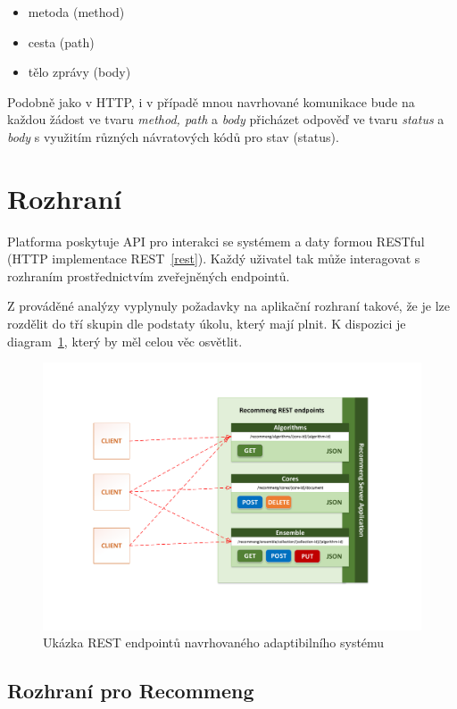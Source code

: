 \documentclass[thesis=M,czech]{FITthesis}[2014/05/07]
\begin{document}
\begin{itemize}
	\item metoda (method)
	\item cesta (path)
	\item tělo zprávy (body)
\end{itemize}

Podobně jako v HTTP, i v případě mnou navrhované komunikace bude na každou žádost ve tvaru \emph{method, path} a \emph{body} přicházet odpověď ve tvaru \emph{status} a \emph{body} s využitím různých návratových kódů pro stav (status).

\section{Rozhraní}

Platforma poskytuje API pro interakci se systémem a daty formou RESTful (HTTP implementace REST~\ref{rest}). Každý uživatel tak může interagovat s rozhraním prostřednictvím zveřejněných endpointů.

Z prováděné analýzy vyplynuly požadavky na aplikační rozhraní takové, že je lze rozdělit do tří skupin dle podstaty úkolu, který mají plnit. K dispozici je diagram~\ref{fig:rest}, který by měl celou věc osvětlit. 

\begin{figure}\centering
	\includegraphics[width=1.0\textwidth]{obr/DIPLOMKA_rest.pdf}
 	\caption[Ukázka REST endpointů navrhovaného adaptibilního systému]{Ukázka REST endpointů navrhovaného adaptibilního systému}\label{fig:rest}
\end{figure}	

\subsection{Rozhraní pro Recommeng}
\end{document}
